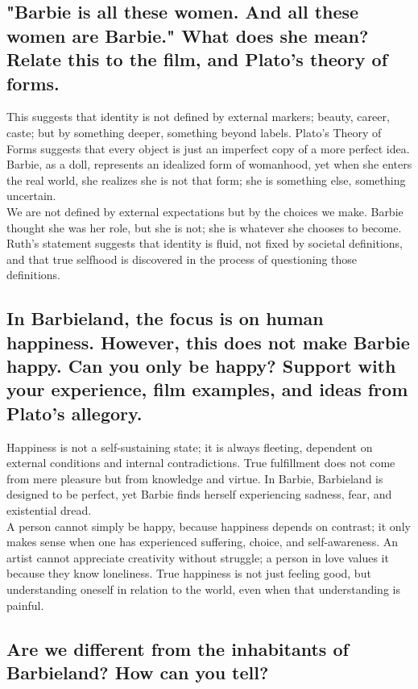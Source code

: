 \subsection{"Barbie is all these women. And all these women are Barbie." What does she mean?
Relate this to the film, and Plato's theory of forms.}

This suggests that identity is not defined by external markers;
beauty, career, caste; but by something deeper, something beyond labels. 
Plato's Theory of Forms suggests that every object is just an imperfect copy 
of a more perfect idea. Barbie, as a doll, represents an idealized form of womanhood, 
yet when she enters the real world, she realizes she is not that form; 
she is something else, something uncertain. \\

We are not defined by external expectations but by the choices we make. 
Barbie thought she was her role, but she is not; she is whatever she chooses to become. 
Ruth’s statement suggests that identity is fluid, not fixed by societal definitions, 
and that true selfhood is discovered in the process of questioning those definitions. \\ 


\subsection{In Barbieland, the focus is on human happiness. However, this does not make Barbie happy.
Can you only be happy? Support with your experience, film examples, and ideas from Plato's allegory.}

Happiness is not a self-sustaining state; it is always fleeting, dependent on external conditions and 
internal contradictions. True fulfillment does not come from mere pleasure but from knowledge and virtue. 
In Barbie, Barbieland is designed to be perfect, yet Barbie finds herself experiencing sadness, 
fear, and existential dread. \\

A person cannot simply be happy, because happiness depends on contrast; it only makes sense when one 
has experienced suffering, choice, and self-awareness. An artist cannot appreciate 
creativity without struggle; a person in love values it because they know loneliness. 
True happiness is not just feeling good, but understanding oneself in relation to the world, 
even when that understanding is painful. \\

\subsection{Are we different from the inhabitants of Barbieland? How can you tell?}

